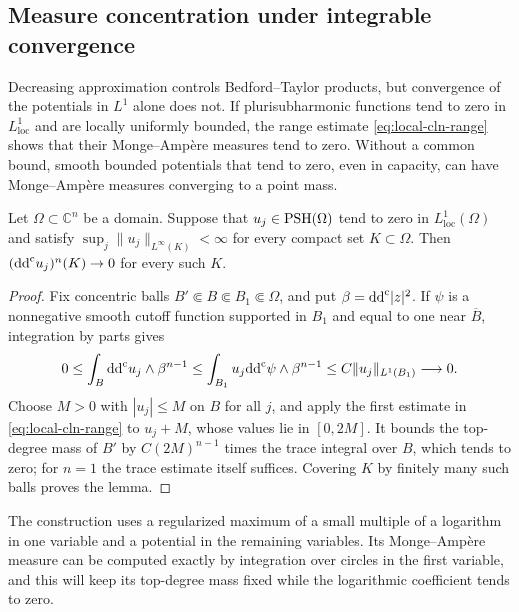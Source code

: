 \subsection{Measure concentration under integrable convergence}
\label{subsec:local-measure-concentration}

Decreasing approximation controls Bedford--Taylor products, but convergence of the potentials in $L^1$ alone does not. If plurisubharmonic functions tend to zero in $L^1_{\mathrm{loc}}$ and are locally uniformly bounded, the range estimate \eqref{eq:local-cln-range} shows that their Monge--Amp\`ere measures tend to zero. Without a common bound, smooth bounded potentials that tend to zero, even in capacity, can have Monge--Amp\`ere measures converging to a point mass.

\begin{lemma}\label{lem:common-bound-zero-measure}
Let $\Omega\subset\mathbb C^n$ be a domain. Suppose that $u_j\in\mathrm{PSH}(\Omega)$ tend to zero in $L^1_{\mathrm{loc}}(\Omega)$ and satisfy $\sup_j\|u_j\|_{L^\infty(K)}<\infty$ for every compact set $K\subset\Omega$. Then $(\mathrm{dd}^{\mathrm{c}} u_j)^n(K)\to0$ for every such $K$.
\end{lemma}
\begin{proof}
Fix concentric balls $B'\Subset B\Subset B_1\Subset\Omega$, and put $\beta=\mathrm{dd}^{\mathrm{c}}|z|^2$. If $\psi$ is a nonnegative smooth cutoff function supported in $B_1$ and equal to one near $\overline B$, integration by parts gives
\[
 0\leq\int_B\mathrm{dd}^{\mathrm{c}} u_j\wedge\beta^{n-1}
 \leq\int_{B_1}u_j\mathrm{dd}^{\mathrm{c}}\psi\wedge\beta^{n-1}
 \leq C\|u_j\|_{L^1(B_1)}\longrightarrow0.
\]
Choose $M>0$ with $|u_j|\leq M$ on $B$ for all $j$, and apply the first estimate in \eqref{eq:local-cln-range} to $u_j+M$, whose values lie in $[0,2M]$. It bounds the top-degree mass of $B'$ by $C(2M)^{n-1}$ times the trace integral over $B$, which tends to zero; for $n=1$ the trace estimate itself suffices. Covering $K$ by finitely many such balls proves the lemma.
\end{proof}

The construction uses a regularized maximum of a small multiple of a logarithm in one variable and a potential in the remaining variables. Its Monge--Amp\`ere measure can be computed exactly by integration over circles in the first variable, and this will keep its top-degree mass fixed while the logarithmic coefficient tends to zero.

